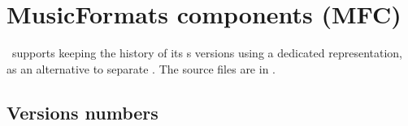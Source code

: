 



\chapter{MusicFormats components (MFC)}\label{MusicFormats components (MFC)}

\mf\ supports keeping the history of its \component s versions using a dedicated representation, as an alternative to separate . The source files are in \mfc.


\section{Versions numbers}\label{Versions numbers}

